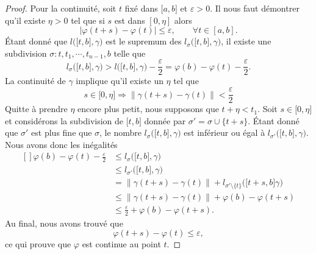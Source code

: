 \begin{proof}
    Pour la continuité, soit $t$ fixé dans $\mathopen[ a , b \mathclose]$ et $\varepsilon>0$. Il nous faut démontrer qu'il existe $\eta>0$ tel que si $s$ est dans $[0,\eta]$ alors 
\[
|\varphi(t+s)-\varphi(t)|\leq \varepsilon, \qquad \forall t \in [a,b].
\] 
Étant donné que $l\big( \mathopen[ t , b \mathclose],\gamma \big)$ est le supremum des $l_{\sigma}\big( \mathopen[ t , b \mathclose],\gamma \big)$, il existe une subdivision $\sigma:t,t_1,\cdots,t_{n-1},b$ telle que
    \begin{equation}
        l_{\sigma}\big( \mathopen[ t , b \mathclose],\gamma \big)>l\big( \mathopen[ t , b \mathclose],\gamma \big)-\frac{ \varepsilon }{2}=\varphi(b)-\varphi(t)-\frac{ \varepsilon }{2}.
    \end{equation}
    La continuité de $\gamma$ implique qu'il existe un $\eta$ tel que
    \begin{equation}
        s\in\mathopen[ 0 , \eta \mathclose]\Rightarrow\| \gamma(t+s)-\gamma(t) \|<\frac{ \varepsilon }{2}
    \end{equation}
    Quitte à prendre $\eta$ encore plus petit, nous supposons que $t+\eta<t_1$. Soit $s\in\mathopen[ 0 , \eta \mathclose]$ et considérons la subdivision de $\mathopen[ t , b \mathclose]$ donnée par $\sigma'=\sigma\cup\{ t+s \}$. Étant donné que $\sigma'$ est plus fine que $\sigma$, le nombre $l_{\sigma}\big( \mathopen[ t , b \mathclose],\gamma \big)$ est inférieur ou égal à $l_{\sigma'}\big( \mathopen[ t , b \mathclose],\gamma \big)$. Nous avons donc les inégalités
    \begin{equation}
        \begin{aligned}[]
            \varphi(b)-\varphi(t)-\frac{ \varepsilon }{2}&\leq l_{\sigma}\big( \mathopen[ t , b \mathclose],\gamma \big)\\
            &\leq l_{\sigma'}\big( \mathopen[ t , b \mathclose],\gamma \big)\\
            &= \big\| \gamma(t+s)-\gamma(t) \big\|+l_{\sigma'\setminus\{ t \}}\big( \mathopen[ t+s , b \mathclose]\gamma \big)\\
            &\leq\| \gamma(t+s)-\gamma(t) \|+\varphi(b)-\varphi(t+s)\\
            &\leq \frac{ \varepsilon }{2}+\varphi(b)-\varphi(t+s).
        \end{aligned}
    \end{equation}
    Au final, nous avons trouvé que
    \begin{equation}
        \varphi(t+s)-\varphi(t)\leq\varepsilon,
    \end{equation} 
    ce qui prouve que $\varphi$ est continue au point $t$.
\end{proof}

